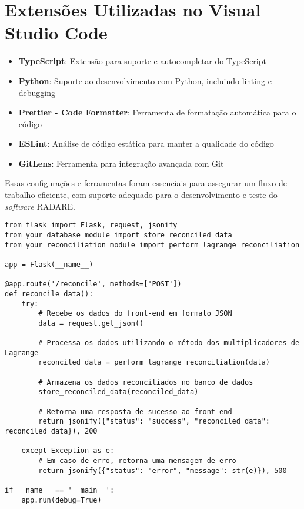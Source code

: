 \section{Extensões Utilizadas no Visual Studio Code}
\begin{itemize}
    \item \textbf{TypeScript}: Extensão para suporte e autocompletar do TypeScript
    \item \textbf{Python}: Suporte ao desenvolvimento com Python, incluindo linting e debugging
    \item \textbf{Prettier - Code Formatter}: Ferramenta de formatação automática para o código
    \item \textbf{ESLint}: Análise de código estática para manter a qualidade do código
    \item \textbf{GitLens}: Ferramenta para integração avançada com Git
\end{itemize}

Essas configurações e ferramentas foram essenciais para assegurar um fluxo de trabalho eficiente, com suporte adequado para o desenvolvimento e teste do \textit{software} RADARE.


\label{Anexo:CodigoRouteReconcile}

\begin{verbatim}
from flask import Flask, request, jsonify
from your_database_module import store_reconciled_data
from your_reconciliation_module import perform_lagrange_reconciliation

app = Flask(__name__)

@app.route('/reconcile', methods=['POST'])
def reconcile_data():
    try:
        # Recebe os dados do front-end em formato JSON
        data = request.get_json()

        # Processa os dados utilizando o método dos multiplicadores de Lagrange
        reconciled_data = perform_lagrange_reconciliation(data)

        # Armazena os dados reconciliados no banco de dados
        store_reconciled_data(reconciled_data)

        # Retorna uma resposta de sucesso ao front-end
        return jsonify({"status": "success", "reconciled_data": reconciled_data}), 200

    except Exception as e:
        # Em caso de erro, retorna uma mensagem de erro
        return jsonify({"status": "error", "message": str(e)}), 500

if __name__ == '__main__':
    app.run(debug=True)
\end{verbatim}

